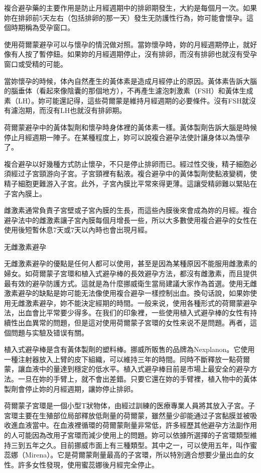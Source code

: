 \documentclass[12pt,UTF8]{ctexbook}
\begin{document}
複合避孕藥的主要作用是防止月經週期中的排卵期發生，大約是每個月一次。如果妳在排卵前5天左右（包括排卵的那一天）發生无防護性行為，妳可能會懷孕。這個時期稱為受孕窗口。

使用荷爾蒙避孕可以与懷孕的情況做对照。當妳懷孕時，妳的月經週期停止，就好像有人按了暫停鈕。如果妳的月經週期停止，沒有排卵，而沒有排卵也就沒有受孕窗口或受精的可能。

當妳懷孕的時候，体內自然產生的黃体素是造成月經停止的原因。黃体素告訴大腦的腦垂体（看起來像陰囊的那個地方），不再產生濾泡刺激素（FSH）和黃体生成素（LH）。妳可能還記得，這些荷爾蒙是維持月經週期的必要條件。沒有FSH就沒有濾泡期，而沒有LH也就沒有排卵期。

荷爾蒙避孕中的黃体製劑和懷孕時身体裡的黃体素一樣。黃体製劑告訴大腦是時候停止月經週期一陣子。在某種程度上，妳可以說複合避孕法使計讓身体以為懷孕了。

複合避孕以好幾種方式防止懷孕，不只是停止排卵而已。經过性交後，精子細胞必須經过子宮頸游向子宮。子宮頸裡有黏液。複合避孕中的黃体製劑使黏液變稠，使精子細胞更難游入子宮。此外，子宮內膜比平常來得更薄。這讓受精卵難以緊貼在子宮內膜上。

雌激素通常負責子宮壁或子宮內膜的生長，而這些內膜後來會成為妳的月經。複合避孕法中的雌激素讓子宮內膜每個月增長一些，所以大多數使用複合避孕的女性在使用後短暫休息7天或7天以內時也會出現月經。





无雌激素避孕




无雌激素避孕的優點是任何人都可以使用，甚至是因為某種原因不能服用雌激素的婦女。如荷爾蒙子宮環和植入式避孕棒的長效避孕方法，都沒有雌激素，而且提供最有效的避孕防護方式。這就是為什麼挪威衛生當局建議大家作為首選。使用无雌激素避孕的缺點是妳可能无法像使用複合避孕一樣控制出血。換句话說，如果妳使用无雌激素避孕，妳不能決定經期的時間。一般来说，使用各種形式的荷爾蒙避孕法，出血會比平常要少得多。在我们的印象裡，一些使用植入式避孕棒的女性有持續性出血異常的問題，但是這对使用荷爾蒙子宮環的女性来说不是問題。再者，這個問題与实驗及错误有關。

植入式避孕棒是含有黃体製劑的塑料棒。挪威所販售的品牌為Nexplanon。它使用一種注射器放入上臂的皮下組織，可以維持三年的時間。同時不斷釋放一點荷爾蒙，讓血液中的量達到穩定的低水平。植入式避孕棒目前是市場上最安全的避孕方法。一旦在妳的手臂上，就不會出差錯。只要它還在妳的手臂裡，植入物中的黃体製劑會停止妳的月經週期，讓妳停止排卵。

荷爾蒙子宮環是一個小型T狀物体，由經过訓練的医療專業人員將其放入子宮。子宮環主要在生殖部位局部釋放低劑量的荷爾蒙，雖然量少卻能通过子宮黏膜並被吸收進血液當中。在血液裡循環的荷爾蒙劑量非常低，許多經歷其他避孕方法副作用的人可能因為改用子宮環而減少使用上的問題。妳可以依據所選擇的子宮環類型維持三到五年之久。目前挪威市面上有三種類型。其中之一，可以使用五年，叫作蜜蕊娜（Mirena）。它是荷爾蒙劑量最高的子宮環，所以特別適合想要少量出血的女性。許多女性發現，使用蜜蕊娜後月經完全停止。
\end{document}
